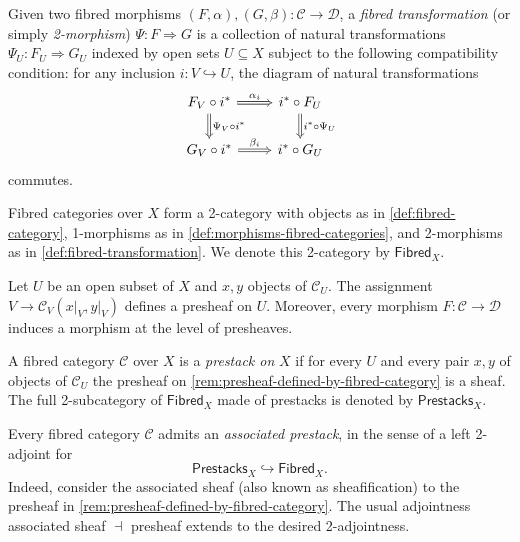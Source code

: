 \begin{definition}\label{def:fibred-transformation}
	Given two fibred morphisms $(F,\alpha),(G,\beta)\colon \mathcal{C} \to \mathcal{D}$, a \emph{fibred transformation} (or simply \textit{2-morphism}) $\Psi\colon F \Rightarrow G$ is a collection of natural transformations $\Psi_{U}\colon F_{U} \Rightarrow G_{U}$ indexed by open sets $U\subseteq X$ subject to the following compatibility condition: for any inclusion $i\colon V \hookrightarrow U$, the diagram of natural transformations 
	\begin{equation}\label{eqn:fibred-transformation-compatibility}
	\begin{tikzcd}
		F_{V} \circ i^{*} \ar[r, Rightarrow, "\alpha_{i}"] \ar[d, Rightarrow, "\Psi_{V} \circ i^{*}"] & i^{*} \circ F_{U} \ar[d, Rightarrow, "i^{*}\circ \Psi_{U}"] \\
		G_{V} \circ i^{*} \ar[r, Rightarrow, "\beta_{i}"] &  i^{*}\circ G_{U} 
	\end{tikzcd}
	\end{equation}
	commutes.
\end{definition}
\begin{remark}\label{rem:fibred-categories-form-a-2-category}
	Fibred categories over $X$ form a 2-category with objects as in \cref{def:fibred-category}, 1-morphisms as in \cref{def:morphisms-fibred-categories}, and 2-morphisms as in \cref{def:fibred-transformation}. We denote this 2-category by $\mathsf{Fibred}_{X}$.
\end{remark}
\begin{remark}\label{rem:presheaf-defined-by-fibred-category}
	Let $U$ be an open subset of $X$ and $x,y$ objects of $\mathcal{C}_{U}$. The assignment $V \to \mathcal{C}_{V}(x\lvert_{V}, y\lvert_{V})$ defines a presheaf on $U$. Moreover, every morphism $F\colon \mathcal{C} \to \mathcal{D}$ induces a morphism at the level of presheaves.
\end{remark}
\begin{definition}\label{def:prestack}
	A fibred category $\mathcal{C}$ over $X$ is a \textit{prestack on} $X$ if for every $U$ and every pair $x,y$ of objects of $\mathcal{C}_{U}$ the presheaf on \cref{rem:presheaf-defined-by-fibred-category} is a sheaf. The full 2-subcategory of $\mathsf{Fibred}_{X}$ made of prestacks is denoted by $\mathsf{Prestacks}_{X}$.
\end{definition}
\begin{remark}\label{rem:associated-prestack-of-a-fibred-category}
	Every fibred category $\mathcal{C}$ admits an \textit{associated prestack}, in the sense of a left 2-adjoint for
	\[
		\mathsf{Prestacks}_{X} \hookrightarrow \mathsf{Fibred}_{X}.
	\]
	Indeed, consider the associated sheaf (also known as sheafification) to the presheaf in \cref{rem:presheaf-defined-by-fibred-category}. The usual adjointness associated sheaf $\dashv$ presheaf extends to the desired 2-adjointness. 
\end{remark}
